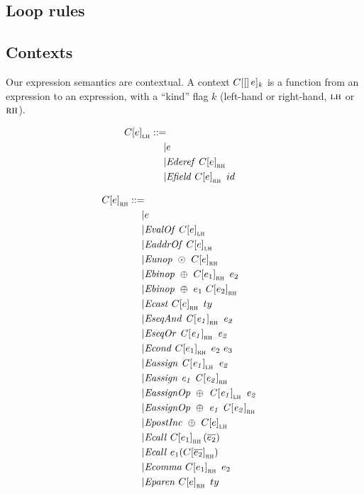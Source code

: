 \documentclass{llncs}
\begin{document}
\subsection{Loop rules}

\loops

\subsection{Contexts}
\label{app:contexts}

Our expression semantics are contextual. A context \(C \!\left[[\right]e]_k\) is a function from an
expression to an expression, with a ``kind'' flag \(k\) (left-hand or right-hand, \(\textnormal{\sc lh}\) or \(\textnormal{\sc rh}\)).

\[\begin{aligned}
\ctx{\expr}_\lh ::= \\
| & \expr & \\ %
| & \deref{\ctx{\expr}_\rh} \\ %
| & \field{\ctx{\expr}_\rh}{id} \\ %
\end{aligned}\]

\[\begin{aligned}
\ctx{\expr}_\rh ::= \\
| & \expr & \\ %
| & \valof{\ctx{\expr}_\lh} \\ %
| & \addrof{\ctx{\expr}_\lh} \\ %
| & \unop{\odot}{\ctx{\expr}_\rh} \\ %
| & \binop{\oplus}{\ctx{\expr_1}_\rh}{\expr_2} \\ %
| & \binop{\oplus}{\expr_1}{\ctx{\expr_2}_\rh} \\ %
| & \cast{\ctx{\expr}_\rh}{\type} \\ %
| & \seqand{\ctx{\expr_1}_\rh}{\expr_2} \\ %
| & \seqor{\ctx{\expr_1}_\rh}{\expr_2} \\ %
| & \condition{\ctx{\expr_1}_\rh}{\expr_2}{\expr_3} \\ %
| & \assign{\ctx{\expr_1}_\lh}{\expr_2} \\ %
| & \assign{\expr_1}{\ctx{\expr_2}_\rh} \\ %
| & \assignop{\oplus}{\ctx{\expr_1}_\lh}{\expr_2} \\ %
| & \assignop{\oplus}{\expr_1}{\ctx{\expr_2}_\rh} \\ %
| & \postinc{\oplus}{\ctx{\expr}_\lh} \\ %
| & \call{\ctx{\expr_1}_\rh}{\overline{\expr_2}} \\ %
| & \call{\expr_1}{\ctx{\overline{\expr_2}}_\rh} \\ %
| & \comma{\ctx{\expr_1}_\rh}{\expr_2} \\ %
| & \paren{\ctx{\expr}_\rh}{\type}{} \\ %
\end{aligned}\]
\end{document}
